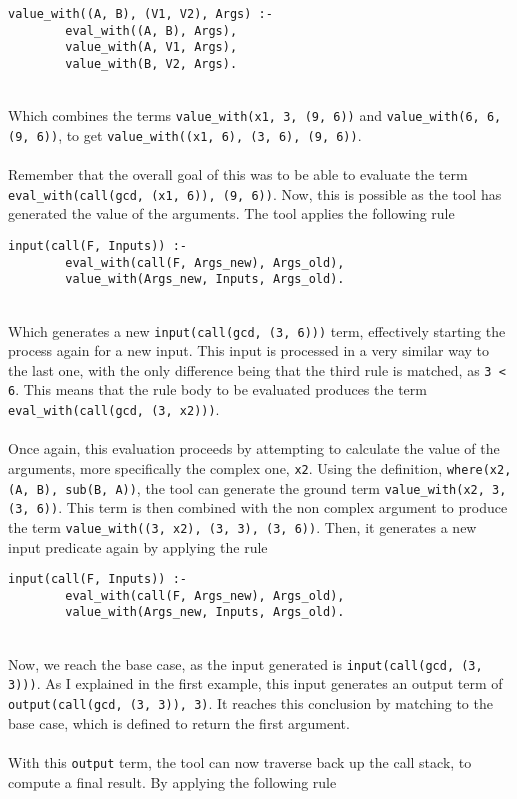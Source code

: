 \begin{lstlisting}[firstnumber=85]
value_with((A, B), (V1, V2), Args) :- 
		eval_with((A, B), Args), 
		value_with(A, V1, Args), 
		value_with(B, V2, Args).
\end{lstlisting}
\mbox{} \\
Which combines the terms \lstinline{value_with(x1, 3, (9, 6))} and \lstinline{value_with(6, 6, (9, 6))}, to get \lstinline{value_with((x1, 6), (3, 6), (9, 6))}. \\ \\ %
Remember that the overall goal of this was to be able to evaluate the term \lstinline{eval_with(call(gcd, (x1, 6)), (9, 6))}. Now, this is possible as the tool has generated the value of the arguments. The tool applies the following rule \\ %

\begin{lstlisting}[firstnumber=193]
input(call(F, Inputs)) :- 
		eval_with(call(F, Args_new), Args_old), 
		value_with(Args_new, Inputs, Args_old).
\end{lstlisting}
\mbox{} \\
Which generates a new \lstinline{input(call(gcd, (3, 6)))} term, effectively starting the process again for a new input. This input is processed in a very similar way to the last one, with the only difference being that the third rule is matched, as \lstinline{3 < 6}. This means that the rule body to be evaluated produces the term \lstinline{eval_with(call(gcd, (3, x2)))}. \\ \\%
Once again, this evaluation proceeds by attempting to calculate the value of the arguments, more specifically the complex one, \lstinline{x2}. Using the definition, \lstinline{where(x2, (A, B), sub(B, A))}, the tool can generate the ground term \lstinline{value_with(x2, 3, (3, 6))}. This term is then combined with the non complex argument to produce the term \lstinline{value_with((3, x2), (3, 3), (3, 6))}. Then, it generates a new input predicate again by applying the rule \\ 

\begin{lstlisting}[firstnumber=193]
input(call(F, Inputs)) :- 
		eval_with(call(F, Args_new), Args_old), 
		value_with(Args_new, Inputs, Args_old).
\end{lstlisting}
\mbox{} \\
Now, we reach the base case, as the input generated is \lstinline{input(call(gcd, (3, 3)))}. As I explained in the first example, this input generates an output term of \lstinline{output(call(gcd, (3, 3)), 3)}. It reaches this conclusion by matching to the base case, which is defined to return the first argument. \\ \\
With this \lstinline{output} term, the tool can now traverse back up the call stack, to compute a final result. By applying the following rule \\ %

